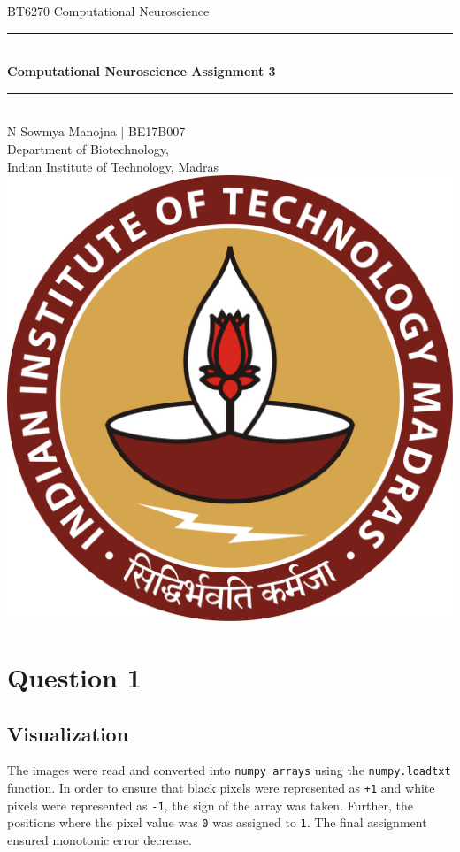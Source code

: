 \documentclass[12pt,a4paper]{article}
\author{N Sowmya Manojna}
\def\tt#1{\texttt{#1}}
\begin{document}
\begin{titlepage}
	\begin{center}
		\vspace{3em}
		\large {BT6270 Computational Neuroscience}
		\vspace{10em}

		\rule{0.9\linewidth}{0.5mm} \\[0.4cm]
	    \large{\bfseries{Computational Neuroscience Assignment 3}} \\
	    \rule{0.9\linewidth}{0.5mm} \\[3 em]

	    N Sowmya Manojna | BE17B007\\
		Department of Biotechnology,\\
		Indian Institute of Technology, Madras\\

		\vspace{5em}
		\includegraphics[scale = 0.09]{images/iitmlogo.png}

	\end{center}
\end{titlepage}

\section{Question 1}
\subsection{Visualization}
The images were read and converted into \tt{numpy arrays} using the \tt{numpy.loadtxt} function. In order to ensure that black pixels were represented as \tt{+1} and white pixels were represented as \tt{-1}, the sign of the array was taken. Further, the positions where the pixel value was \tt{0} was assigned to \tt{1}. The final assignment ensured monotonic error decrease.\\
\end{document}
